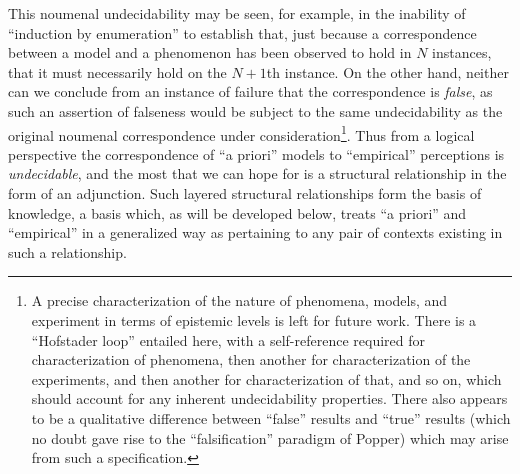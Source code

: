 \documentclass[pra,twocolumn,groupedaddress,10pt]{revtex4}
\theoremstyle{definition}
\begin{document}
This noumenal undecidability may be seen, for example, in the inability of ``induction by enumeration'' to establish that, just because a correspondence between a model and a phenomenon has been observed to hold in $N$ instances, that it must necessarily hold on the $N+1$th instance\cite{russell}. On the other hand, neither can we conclude from an instance of failure that the correspondence is \emph{false}, as such an assertion of falseness would be subject to the same undecidability as the original noumenal correspondence under consideration\footnote{A precise characterization of the nature of phenomena, models, and experiment in terms of epistemic levels is left for future work. There is a ``Hofstader loop'' entailed here, with a self-reference required for characterization of phenomena, then another for characterization of the experiments, and then another for characterization of that, and so on, which should account for any inherent undecidability properties. There also appears to be a qualitative difference between ``false'' results and ``true'' results (which no doubt gave rise to the ``falsification'' paradigm of Popper\cite{popper}) which may arise from such a specification.}. Thus from a logical perspective the correspondence of ``a priori'' models to ``empirical'' perceptions is \emph{undecidable}, and the most that we can hope for is a structural relationship in the form of an adjunction. Such layered structural relationships form the basis of knowledge, a basis which, as will be developed below, treats ``a priori'' and ``empirical'' in a generalized way as pertaining to any pair of contexts existing in such a relationship.
\end{document}
